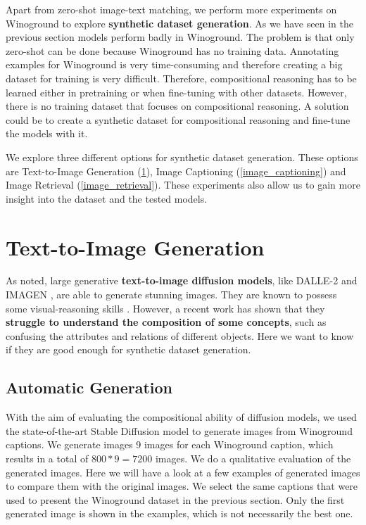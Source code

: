 Apart from zero-shot image-text matching, we perform more experiments on Winoground to explore \textbf{synthetic dataset generation}. As we have seen in the previous section models perform badly in Winoground. The problem is that only zero-shot can be done because Winoground has no training data. Annotating examples for Winoground is very time-consuming and therefore creating a big dataset for training is very difficult. Therefore, compositional reasoning has to be learned either in pretraining or when fine-tuning with other datasets. However, there is no training dataset that focuses on compositional reasoning. A solution could be to create a synthetic dataset for compositional reasoning and fine-tune the models with it.

We explore three different options for synthetic dataset generation. These options are Text-to-Image Generation (\ref{text_to_image_generation}), Image Captioning (\ref{image_captioning}) and Image Retrieval (\ref{image_retrieval}). These experiments also allow us to gain more insight into the dataset and the tested models.

\section{Text-to-Image Generation} \label{text_to_image_generation}

As noted, large generative \textbf{text-to-image diffusion models}, like DALLE-2 \cite{ramesh2022hierarchical} and IMAGEN \cite{saharia2022photorealistic}, are able to generate stunning images. They are known to possess some visual-reasoning skills \cite{cho2022dall}. However, a recent work \cite{liu2022compositional} has shown that they \textbf{struggle to understand the composition of some concepts}, such as confusing the attributes and relations of different objects. Here we want to know if they are good enough for synthetic dataset generation.

\subsection{Automatic Generation}

With the aim of evaluating the compositional ability of diffusion models, we used the state-of-the-art Stable Diffusion model \cite{rombach2021highresolution} to generate images from Winoground captions. We generate images 9 images for each Winoground caption, which results in a total of $800*9=7200$ images. We do a qualitative evaluation of the generated images. Here we will have a look at a few examples of generated images to compare them with the original images. We select the same captions that were used to present the Winoground dataset in the previous section. Only the first generated image is shown in the examples, which is not necessarily the best one.

